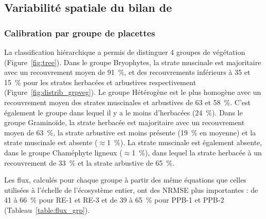 \subsection{Variabilité spatiale du bilan de \coo}

\subsubsection{Calibration par groupe de placettes}



La classification hiérarchique a permis de distinguer 4 groupes de végétation (Figure~\ref{fig:tree}).
Dans le groupe Bryophytes, la strate muscinale est majoritaire avec un recouvrement moyen de \SI{91}{\percent}, et des recouvrements inférieurs à \num{35} et \SI{15}{\percent} pour les strates herbacées et arbustives respectivement (Figure~\ref{fig:distrib_grpveg}).
Le groupe Hétérogène est le plus homogène avec un recouvrement moyen des strates muscinales et arbustives de \num{63} et \SI{58}{\percent}.
C'est également le groupe dans lequel il y a le moins d'herbacées (\SI{24}{\percent}).
Dans le groupe Graminoïde, la strate herbacée est majoritaire avec un recouvrement moyen de \SI{63}{\percent}, la strate arbustive est moins présente (\SI{19}{\percent} en moyenne) et la strate muscinale est absente ($\approx$\SI{1}{\percent}).
La strate muscinale est également absente, dans le groupe Chaméphyte ligneux ($\approx$\SI{1}{\percent}), dans lequel la strate herbacée à un recouvrement de \SI{33}{\percent} et la strate arbustive de \SI{65}{\percent}.

Les flux, calculés pour chaque groupe à partir des même équations que celles utilisées à l'échelle de l'écosystème entier, ont des NRMSE plus importantes : de \num{41} à \SI{66}{\percent} pour RE-1 et RE-3 et de \num{39} à \SI{65}{\percent} pour PPB-1 et PPB-2 (Tableau~\ref{table:flux_grp}).


